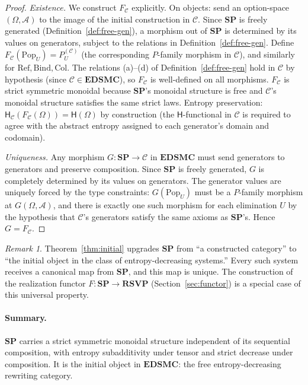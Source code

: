 \documentclass[12pt,a4paper]{article}
\theoremstyle{definition}
\theoremstyle{remark}
\newtheorem{remark}[theorem]{Remark}
\newcommand{\Ent}{\mathsf{H}}
\newcommand{\SP}{\mathbf{SP}}
\newcommand{\RSVP}{\mathbf{RSVP}}
\newcommand{\EDSMC}{\mathbf{EDSMC}}
\newcommand{\Pop}{\mathrm{Pop}}
\newcommand{\Ref}{\mathrm{Ref}}
\newcommand{\Bind}{\mathrm{Bind}}
\newcommand{\Col}{\mathrm{Col}}
\begin{document}
\begin{proof}
\textit{Existence.} We construct $F_\mathcal{C}$ explicitly. On objects: send an
option-space $(\Omega,\mathcal{A})$ to the image of the initial construction in
$\mathcal{C}$. Since $\SP$ is freely generated (Definition~\ref{def:free-gen}), a
morphism out of $\SP$ is determined by its values on generators, subject to the
relations in Definition~\ref{def:free-gen}. Define $F_\mathcal{C}(\Pop_U)=P_U^{(\mathcal{C})}$
(the corresponding $P$-family morphism in $\mathcal{C}$), and similarly for $\Ref,\Bind,\Col$.
The relations (a)--(d) of Definition~\ref{def:free-gen} hold in $\mathcal{C}$ by hypothesis
(since $\mathcal{C}\in\EDSMC$), so $F_\mathcal{C}$ is well-defined on all morphisms.
$F_\mathcal{C}$ is strict symmetric monoidal because $\SP$'s monoidal structure is
free and $\mathcal{C}$'s monoidal structure satisfies the same strict laws.
Entropy preservation: $\Ent_\mathcal{C}(F_\mathcal{C}(\Omega))=\Ent(\Omega)$ by
construction (the $\Ent$-functional in $\mathcal{C}$ is required to agree with
the abstract entropy assigned to each generator's domain and codomain).

\textit{Uniqueness.} Any morphism $G:\SP\to\mathcal{C}$ in $\EDSMC$ must send
generators to generators and preserve composition. Since $\SP$ is freely generated,
$G$ is completely determined by its values on generators. The generator values are
uniquely forced by the type constraints: $G(\Pop_U)$ must be a $P$-family morphism
at $G(\Omega,\mathcal{A})$, and there is exactly one such morphism for each
elimination $U$ by the hypothesis that $\mathcal{C}$'s generators satisfy the same
axioms as $\SP$'s. Hence $G=F_\mathcal{C}$.
\end{proof}

\begin{remark}
Theorem~\ref{thm:initial} upgrades $\SP$ from ``a constructed category'' to ``the
initial object in the class of entropy-decreasing systems.'' Every such system
receives a canonical map from $\SP$, and this map is unique. The construction of the
realization functor $F:\SP\to\RSVP$ (Section~\ref{sec:functor}) is a special case of
this universal property.
\end{remark}

\paragraph{Summary.} $\SP$ carries a strict symmetric monoidal structure independent
of its sequential composition, with entropy subadditivity under tensor and strict
decrease under composition. It is the initial object in $\EDSMC$: the free
entropy-decreasing rewriting category.
\end{document}
